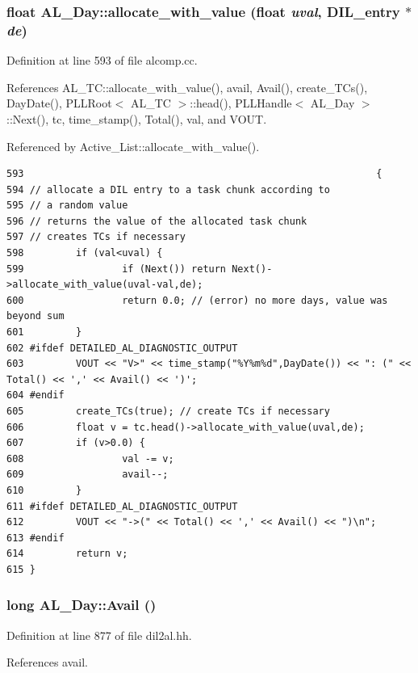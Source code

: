 \subsubsection{\setlength{\rightskip}{0pt plus 5cm}float AL\_\-Day::allocate\_\-with\_\-value (float {\em uval}, {\bf DIL\_\-entry} $\ast$ {\em de})}\label{classAL__Day_a21}




Definition at line 593 of file alcomp.cc.

References AL\_\-TC::allocate\_\-with\_\-value(), avail, Avail(), create\_\-TCs(), Day\-Date(), PLLRoot$<$ AL\_\-TC $>$::head(), PLLHandle$<$ AL\_\-Day $>$::Next(), tc, time\_\-stamp(), Total(), val, and VOUT.

Referenced by Active\_\-List::allocate\_\-with\_\-value().



\footnotesize\begin{verbatim}593                                                             {
594 // allocate a DIL entry to a task chunk according to
595 // a random value
596 // returns the value of the allocated task chunk
597 // creates TCs if necessary
598         if (val<uval) {
599                 if (Next()) return Next()->allocate_with_value(uval-val,de);
600                 return 0.0; // (error) no more days, value was beyond sum
601         }
602 #ifdef DETAILED_AL_DIAGNOSTIC_OUTPUT
603         VOUT << "V>" << time_stamp("%Y%m%d",DayDate()) << ": (" << Total() << ',' << Avail() << ')';
604 #endif
605         create_TCs(true); // create TCs if necessary
606         float v = tc.head()->allocate_with_value(uval,de);
607         if (v>0.0) {
608                 val -= v;
609                 avail--;
610         }
611 #ifdef DETAILED_AL_DIAGNOSTIC_OUTPUT
612         VOUT << "->(" << Total() << ',' << Avail() << ")\n";
613 #endif
614         return v;
615 }
\end{verbatim}\normalsize 
{}
\subsubsection{\setlength{\rightskip}{0pt plus 5cm}long AL\_\-Day::Avail ()\hspace{0.3cm}{\tt  [inline]}}\label{classAL__Day_a8}




Definition at line 877 of file dil2al.hh.

References avail.

